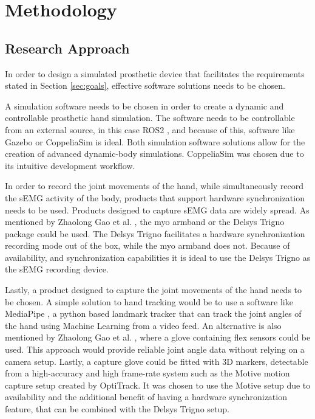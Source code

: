 \documentclass[../main.tex]{subfiles}
\begin{document}
\section{Methodology}

\subsection{Research Approach}
\label{sec:software}

In order to design a simulated prosthetic device that facilitates the requirements stated in Section \ref{sec:goals}, effective software solutions needs to be chosen.

A simulation software needs to be chosen in order to create a dynamic and controllable prosthetic hand simulation.
The software needs to be controllable from an external source, in this case ROS2 \cite{ros2}, and because of this, software like Gazebo \cite{gazebo} or CoppeliaSim \cite{coppeliasim} is ideal.
Both simulation software solutions allow for the creation of advanced dynamic-body simulations.
CoppeliaSim \cite{coppeliasim} was chosen due to its intuitive development workflow.

In order to record the joint movements of the hand, while simultaneously record the sEMG activity of the body, products that support hardware synchronization needs to be used.
Products designed to capture sEMG data are widely spread.
As mentioned by Zhaolong Gao et al. \cite{Zhaolong2021}, the myo armband \cite{myo} or the Delsys Trigno package \cite{emgworks} could be used.
The Delsys Trigno \cite{emgworks} facilitates a hardware synchronization recording mode out of the box, while the myo armband \cite{myo} does not.
Because of availability, and synchronization capabilities it is ideal to use the Delsys Trigno as the sEMG recording device.

Lastly, a product designed to capture the joint movements of the hand needs to be chosen.
A simple solution to hand tracking would be to use a software like MediaPipe \cite{mediapipe}, a python based landmark tracker that can track the joint angles of the hand using Machine Learning from a video feed.
An alternative is  also mentioned by Zhaolong Gao et al. \cite{Zhaolong2021}, where a glove containing flex sensors could be used.
This approach would provide reliable joint angle data without relying on a camera setup.
Lastly, a capture glove could be fitted with 3D markers, detectable from a high-accuracy and high frame-rate system such as the Motive motion capture setup \cite{optitrack} created by OptiTrack.
It was chosen to use the Motive setup due to availability and the additional benefit of having a hardware synchronization feature, that can be combined with the Delsys Trigno \cite{emgworks} setup.
\end{document}

